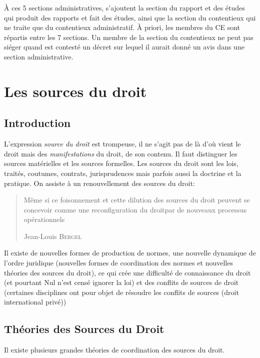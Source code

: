 \documentclass[math]{cours}
\begin{document}
À ces 5 sections administratives, s'ajoutent la section du rapport et des études qui produit des rapports et fait des études,
ainsi que la section du contentieux qui ne traite que du contentieux administratif.
À priori, les membres du CE sont répartis entre les 7 sections.
Un membre de la section du contentieux ne peut pas siéger quand est contesté un décret sur lequel il aurait donné un avis dans une section administrative.



\section{Les sources du droit}
\subsection*{Introduction}
L'expression \emph{source du droit} est trompeuse, il ne s'agit pas de là d'où vient le droit mais des \emph{manifestations} du droit, de son contenu.
Il faut distinguer les sources matérielles et les sources formelles.
Les sources du droit sont les lois, traités, coutumes, contrats, jurisprudences mais parfois aussi la doctrine et la pratique.
On assiste à un renouvellement des sources du droit:
\begin{quote}
	Même si ce foisonnement et cette dilution des sources du droit peuvent se concevoir comme une \og reconfiguration du droit\fg par de nouveaux \og processus opérationnels\fg
	\begin{flushright}
		Jean-Louis \textsc{Bergel}
	\end{flushright}
\end{quote}
Il existe de nouvelles formes de production de normes, une nouvelle dynamique de l'ordre juridique (nouvelles formes de coordination des normes et nouvelles théories des sources du droit), ce qui crée une difficulté de connaissance du droit (et pourtant Nul n'est censé ignorer la loi) et des conflits de sources de droit (certaines disciplines ont pour objet de résoudre les conflits de sources (droit international privé))

\subsection{Théories des Sources du Droit}
Il existe plusieurs grandes théories de coordination des sources du droit.
\end{document}
